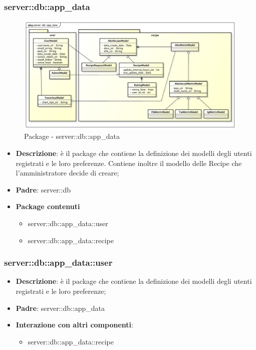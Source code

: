 \subsubsection{server::db::app\_data} %
\label{ssub:bdsm_app_server_app_data}


	\begin{figure}[htbp]
		\centering
		\centerline{\includegraphics[scale=0.38]{./images/server/app_data.pdf}}
		\caption{Package - server::db::app\_data}
	\end{figure}


	\begin{itemize}
		\item \textbf{Descrizione}: è il package che contiene la definizione dei modelli degli utenti registrati e le loro preferenze. Contiene inoltre il modello delle Recipe che l'amministratore decide di creare;
		\item \textbf{Padre}: server::db
		\item \textbf{Package contenuti}
			\begin{itemize}
				\item server::db::app\_data::user
				\item server::db::app\_data::recipe
			\end{itemize}
	\end{itemize}


\subsubsection{server::db::app\_data::user} %
\label{ssub:bdsm_app_server_app_data_user}

	\begin{itemize}
		\item \textbf{Descrizione}: è il package che contiene la definizione dei modelli degli utenti registrati e le loro preferenze;
		\item \textbf{Padre}: server::db::app\_data
		\item \textbf{Interazione con altri componenti}:
			\begin{itemize}
				\item server::db::app\_data::recipe
			\end{itemize}
	\end{itemize}


